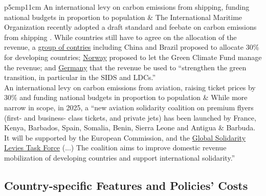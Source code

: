 \begin{table}[H]
\begin{tabular}{p{5cm}p{11cm}}
An international levy on carbon emissions from shipping, funding national budgets in proportion to population & The International Maritime Organization recently adopted a draft standard and feebate on carbon emissions from shipping \citep{imo_draft_2025}. While countries still have to agree on the allocation of the revenue, a \href{https://wwwcdn.imo.org/localresources/en/OurWork/Environment/Documents/Expert%20workshop/MEPC%2080-INF.39-Add.1%20-%20Report%20of%20the%20ad-hoc%20Expert%20Workshop%20on%20comparative%20analysisof%20candidate%20mid-term%20GHG%20redu...%20%28Secretariat%29.pdf}{group of contries} including China and Brazil proposed to allocate 30\% for developing countries; \href{https://wwwcdn.imo.org/localresources/en/OurWork/Environment/Documents/Expert%20workshop/Factsheets/GHG-EW%203-INF.2%20-%20Factsheet%20On%20Emission%20Cap-And-Trade%20System%20(Norway)%20(4).pdf}{Norway}  proposed to let the Green Climate Fund manage the revenue; and \href{https://wwwcdn.imo.org/localresources/en/OurWork/Environment/Documents/Expert%20workshop/Factsheets/GHG-EW%203-INF.4%20-%20Factsheet%20On%20Combination%20Of%20The%20Ghg%20Fuel%20Standard%20With%20A%20Levy%20(Denmark)%20(4).pdf}{Germany} that the revenue be used to ``strengthen the green transition, in particular in the SIDS and LDCs.'' \\ \addlinespace 
An international levy on carbon emissions from aviation, raising ticket prices by 30\% and funding national budgets in proportion to population & While more narrow in scope, in 2025, a ``new aviation solidarity coalition on premium flyers (first- and business- class tickets, and private jets) has been launched by France, Kenya, Barbados, Spain, Somalia, Benin, Sierra Leone and Antigua \& Barbuda. It will be supported by the European Commission, and the \href{https://solidaritylevies.org/eight-countries-launch-solidarity-coalition-for-levies-on-premium-flyers/}{Global Solidarity Levies Task Force} (...) The coalition aims to improve domestic revenue mobilization of developing countries and support international solidarity.'' \\ \addlinespace 
\bottomrule
\end{tabular}
\end{table}

\subsection{Country-specific Features and Policies' Costs}\label{subsec:country_features}

